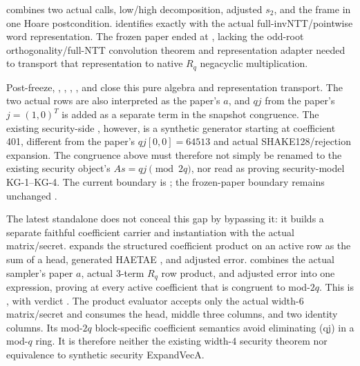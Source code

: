 \begin{caution}
 combines two actual
calls, low/high decomposition, adjusted \(s_2\), and the frame in one Hoare
postcondition.
 identifies
 exactly with the actual
full-invNTT/pointwise word representation.
The frozen paper ended at , lacking the odd-root
orthogonality/full-NTT convolution theorem and representation adapter needed
to transport that representation to native \(R_q\) negacyclic multiplication.

Post-freeze,
,
,
,
, and
close this pure algebra and representation transport.
The two actual  rows are also interpreted as the paper's
\(a\), and \(qj\) from the paper's \(j=(1,0)^T\) is added as a separate term
in the snapshot congruence.
The existing security-side , however, is
a synthetic generator starting at coefficient 401, different from the paper's
\(qj[0,0]=64513\) and actual SHAKE128/rejection expansion.
The congruence above must therefore not simply be renamed to the existing
security object's \(A s=qj\pmod{2q}\), nor read as proving security-model
KG-1--KG-4. The current boundary is \CurrentGate; the frozen-paper boundary
remains unchanged
\cite{post-freeze-kg-rq-haetae-report,
post-freeze-kg-actual-avec-qj-report}.
\end{caution}

The latest standalone  does not
conceal this gap by bypassing it: it builds a separate faithful coefficient
carrier and instantiation with the actual matrix/secret.
 expands the structured
coefficient product on an active row as the sum of a head, generated HAETAE
, and adjusted error.
combines the actual sampler's paper \(a\), actual 3-term \(R_q\) row product,
and adjusted error into one expression, proving at every active coefficient
that  is congruent
to  mod-\(2q\).
This is \statusproved, with verdict \FaithfulAugmentedVerdict.
The product evaluator accepts only the actual width-6 matrix/secret and
consumes the head, middle three columns, and two identity columns.
Its mod-\(2q\) block-specific coefficient semantics avoid eliminating (qj)
in a mod-\(q\) ring. It is therefore neither the existing width-4 security
 theorem nor equivalence to synthetic security
ExpandVecA.

